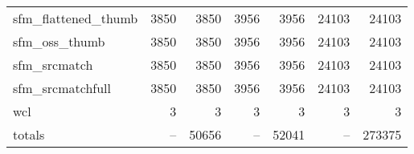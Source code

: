 \begin{table}
\begin{longtable}{lrrrrrr}
		sfm\_flattened\_thumb & 3850 & 3850 & 3956 & 3956 & 24103 & 24103 \\
		sfm\_oss\_thumb & 3850 & 3850 & 3956 & 3956 & 24103 & 24103 \\
		sfm\_srcmatch & 3850 & 3850 & 3956 & 3956 & 24103 & 24103 \\
		sfm\_srcmatchfull & 3850 & 3850 & 3956 & 3956 & 24103 & 24103 \\
		wcl\ddag & 3 & 3 & 3 & 3 & 3 & 3 \\
		\hline
		totals & -- & 50656 & -- & 52041 & -- & 273375 \\
		\hline\hline
	\end{longtable}
\end{table}
